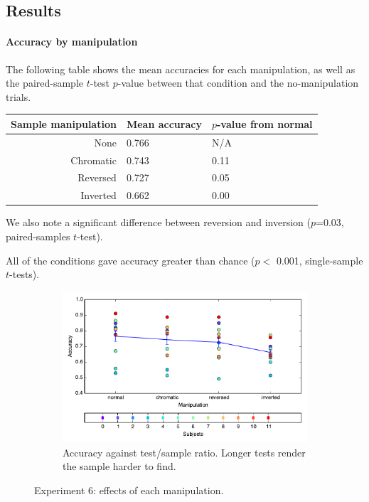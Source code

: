 \subsection{Results}

\paragraph{Accuracy by manipulation}

The following table shows the mean accuracies for each manipulation, as well as the paired-sample $t$-test $p$-value between that condition and the no-manipulation trials.

\begin{center}
\begin{tabular}{ r | l | l  }
\textbf{Sample manipulation} & \textbf{Mean accuracy} & $p$-value from normal\\
\hline
None&  0.766 & N/A \\
Chromatic& 0.743 & 0.11\\
Reversed&  0.727 & 0.05\\
Inverted&  0.662 & 0.00\\
\end{tabular}
\end{center}

We also note a significant difference between reversion and inversion ($p$=0.03, paired-samples $t$-test). 

All of the conditions gave accuracy greater than chance ($p<$  0.001, single-sample $t$-tests).


\begin{figure}[htp]
\centering

\begin{subfigure}[b]{\textwidth}
\centering
                \includegraphics[width=12cm]{img/fig_fire8-manips_correct_manip.pdf}
                \caption{Accuracy against test/sample ratio. Longer tests render the sample harder to find.}
         
        \end{subfigure}
\caption{Experiment 6: effects of each manipulation.}
\end{figure}

